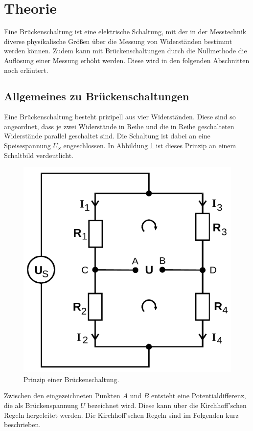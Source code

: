 \section{Theorie}
\label{sec:Theorie}
Eine Brückenschaltung ist eine elektrische Schaltung, mit der in der Messtechnik diverse physikalische Größen über die Messung von
Widerständen bestimmt werden können. Zudem kann mit Brückenschaltungen durch die Nullmethode die Auflösung einer Messung erhöht werden.
Diese wird in den folgenden Abschnitten noch erläutert.

\subsection{Allgemeines zu Brückenschaltungen}
\label{sec:allg}
Eine Brückenschaltung besteht prizipell aus vier Widerständen. Diese sind so angeordnet, dass je zwei Widerstände in Reihe und
die in Reihe geschalteten Widerstände parallel geschaltet sind. Die Schaltung ist dabei an eine Speisespannung $U_S$ engeschlossen.
In Abbildung \ref{fig:allg} ist dieses Prinzip an einem Schaltbild verdeutlicht.

\begin{figure}[H]
    \centering
    \includegraphics[scale=0.4]{pictures/1-allg.png}
    \caption{Prinzip einer Brückenschaltung. \cite{AP01}}
    \label{fig:allg}
\end{figure}
\noindent
Zwischen den eingezeichneten Punkten $A$ und $B$ entsteht eine Potentialdifferenz, die als Brückenspannung $U$ bezeichnet wird. Diese
kann über die Kirchhoff'schen Regeln hergeleitet werden. Die Kirchhoff'schen Regeln sind im Folgenden kurz beschrieben.

